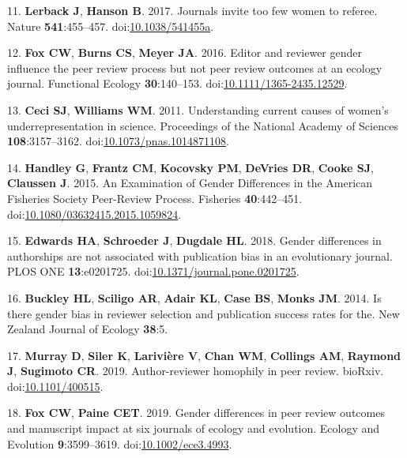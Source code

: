 \documentclass[11pt,]{article}
\begin{document}
\hypertarget{ref-lerback_journals_2017}{}
11. \textbf{Lerback J}, \textbf{Hanson B}. 2017. Journals invite too few
women to referee. Nature \textbf{541}:455--457.
doi:\href{https://doi.org/10.1038/541455a}{10.1038/541455a}.

\hypertarget{ref-fox_editor_2016}{}
12. \textbf{Fox CW}, \textbf{Burns CS}, \textbf{Meyer JA}. 2016. Editor
and reviewer gender influence the peer review process but not peer
review outcomes at an ecology journal. Functional Ecology
\textbf{30}:140--153.
doi:\href{https://doi.org/10.1111/1365-2435.12529}{10.1111/1365-2435.12529}.

\hypertarget{ref-ceci_understanding_2011}{}
13. \textbf{Ceci SJ}, \textbf{Williams WM}. 2011. Understanding current
causes of women's underrepresentation in science. Proceedings of the
National Academy of Sciences \textbf{108}:3157--3162.
doi:\href{https://doi.org/10.1073/pnas.1014871108}{10.1073/pnas.1014871108}.

\hypertarget{ref-handley_examination_2015}{}
14. \textbf{Handley G}, \textbf{Frantz CM}, \textbf{Kocovsky PM},
\textbf{DeVries DR}, \textbf{Cooke SJ}, \textbf{Claussen J}. 2015. An
Examination of Gender Differences in the American Fisheries Society
Peer-Review Process. Fisheries \textbf{40}:442--451.
doi:\href{https://doi.org/10.1080/03632415.2015.1059824}{10.1080/03632415.2015.1059824}.

\hypertarget{ref-edwards_gender_2018}{}
15. \textbf{Edwards HA}, \textbf{Schroeder J}, \textbf{Dugdale HL}.
2018. Gender differences in authorships are not associated with
publication bias in an evolutionary journal. PLOS ONE
\textbf{13}:e0201725.
doi:\href{https://doi.org/10.1371/journal.pone.0201725}{10.1371/journal.pone.0201725}.

\hypertarget{ref-buckley_is_2014}{}
16. \textbf{Buckley HL}, \textbf{Sciligo AR}, \textbf{Adair KL},
\textbf{Case BS}, \textbf{Monks JM}. 2014. Is there gender bias in
reviewer selection and publication success rates for the. New Zealand
Journal of Ecology \textbf{38}:5.

\hypertarget{ref-Murray400515}{}
17. \textbf{Murray D}, \textbf{Siler K}, \textbf{Larivière V},
\textbf{Chan WM}, \textbf{Collings AM}, \textbf{Raymond J},
\textbf{Sugimoto CR}. 2019. Author-reviewer homophily in peer review.
bioRxiv. doi:\href{https://doi.org/10.1101/400515}{10.1101/400515}.

\hypertarget{ref-fox_gender_2019}{}
18. \textbf{Fox CW}, \textbf{Paine CET}. 2019. Gender differences in
peer review outcomes and manuscript impact at six journals of ecology
and evolution. Ecology and Evolution \textbf{9}:3599--3619.
doi:\href{https://doi.org/10.1002/ece3.4993}{10.1002/ece3.4993}.
\end{document}
